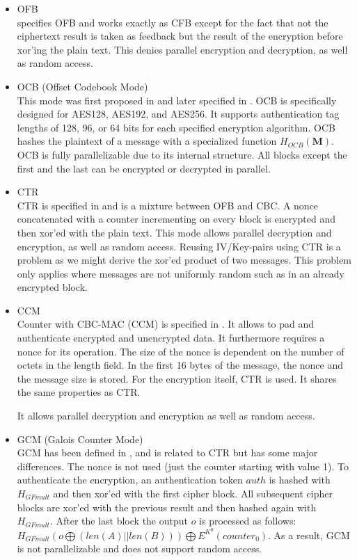 \begin{itemize}
	\item OFB\\
	\cite{dworkin2001recommendation} specifies OFB and works exactly as CFB except for the fact that not the ciphertext result is taken as feedback but the result of the encryption before xor'ing the plain text. This denies parallel encryption and decryption, as well as random access.
	\item OCB (Offset Codebook Mode)\\
	This mode was first proposed in \cite{rogaway2003ocb} and later specified in \cite{krovetz-ocb-04}. OCB is specifically designed for AES128, AES192, and AES256. It supports authentication tag lengths of 128, 96, or 64 bits for each specified encryption algorithm. OCB hashes the plaintext of a message with a specialized function $H_{OCB}(\mathbf{M})$. OCB is fully parallelizable due to its internal structure. All blocks except the first and the last can be encrypted or decrypted in parallel.
	\item CTR\\
	CTR is specified in \cite{lipmaa2000ctr} and is a mixture between OFB and CBC. A nonce concatenated with a counter incrementing on every block is encrypted and then xor'ed with the plain text. This mode allows parallel decryption and encryption, as well as random access. Reusing IV/Key-pairs using CTR is a problem as we might derive the xor'ed product of two messages. This problem only applies where messages are not uniformly random such as in an already encrypted block.
	\item CCM\\
	Counter with CBC-MAC (CCM) is specified in \cite{rfc3610}. It allows to pad and authenticate encrypted and unencrypted data. It furthermore requires a nonce for its operation. The size of the nonce is dependent on the number of octets in the length field. In the first 16 bytes of the message, the nonce and the message size is stored. For the encryption itself, CTR is used. It shares the same properties as CTR. 
	
	It allows parallel decryption and encryption as well as random access.
	\item GCM (Galois Counter Mode)\\
	GCM has been defined in \cite{mcgrew2004galois}, and is related to CTR but has some major differences. The nonce is not used (just the counter starting with value 1). To authenticate the encryption, an authentication token $auth$ is hashed with $H_{GFmult}$ and then xor'ed with the first cipher block. All subsequent cipher blocks are xor'ed with the previous result and then hashed again with $H_{GFmult}$. After the last block the output $o$ is processed  as follows: $H_{GFmult}(o\bigoplus (len(A)||len(B))) \bigoplus E^{K^0}(counter_0)$. As a result, GCM is not parallelizable and does not support random access.
	

\end{itemize}
